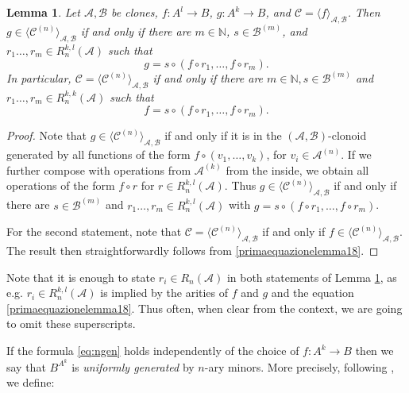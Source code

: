 \documentclass[11pt]{amsart}
\theoremstyle{plain}
\newtheorem{lemma}[thm]{Lemma}
\theoremstyle{definition}
\newcommand{\N}{{\mathbb N}}
\newcommand{\clone}[1]{\mathcal{#1}}
\newcommand{\clonoid}[1]{\mathcal{#1}}
\newcommand{\clodC}{\clonoid{C}}
\newcommand{\cloA}{\clone{A}}
\newcommand{\cloB}{\clone{B}}
\begin{document}
\begin{lemma} \label{lemma:ngen}
Let $\cloA, \cloB$ be clones, $f \colon A^l \to B$, $g \colon A^k \to B$, and $\clodC = \langle f \rangle_{\cloA, \cloB}$. Then $g \in \langle \clodC^{(n)}\rangle_{\cloA, \cloB}$ if and only if there are $m \in \N$, $s \in \cloB^{(m)}$, and $r_1\ldots,r_m \in R_{n}^{k,l}(\cloA)$ such that
\begin{equation}\label{primaequazionelemma18}
    g = s \circ (f \circ r_1, \ldots, f \circ r_m).
\end{equation}
In particular, $\clodC = \langle \clodC^{(n)} \rangle_{\cloA, \cloB}$ if and only if there are $m \in \N, s \in \cloB^{(m)}$ and $r_1\ldots,r_m \in R_{n}^{k,k}(\cloA)$ such that
\begin{equation}f = s \circ (f \circ r_1, \ldots, f \circ r_m). \label{eq:ngen}\end{equation}
\end{lemma}

\begin{proof}
Note that $g \in \langle \clodC^{(n)} \rangle_{\cloA, \cloB}$ if and only if it is in the $(\cloA, \cloB)$-clonoid generated by all functions of the form $f \circ (v_1,\ldots,v_k)$, for $v_i \in \cloA^{(n)}$. If we further compose with operations from $\cloA^{(k)}$ from the inside, we obtain all operations of the form $f \circ r$ for $r\in R_n^{k,l}(\cloA)$. Thus $g \in \langle \clodC^{(n)} \rangle_{\cloA, \cloB}$ if and only if there are 
$s \in \cloB^{(m)}$ and $r_1\ldots,r_m \in R_{n}^{k,l}(\cloA)$ with $g = s \circ (f \circ r_1, \ldots, f \circ r_m)$.

For the second statement, note that $\clodC = \langle \clodC^{(n)} \rangle_{\cloA, \cloB}$ if and only if $f \in \langle \clodC^{(n)} \rangle_{\cloA, \cloB}$. The result then straightforwardly follows from \eqref{primaequazionelemma18}.
\end{proof}

Note that it is enough to state $r_i \in R_n(\cloA)$ in both statements of Lemma \ref{lemma:ngen}, as e.g. $r_i \in R_{n}^{k,l}(\cloA)$ is implied by the arities of $f$ and $g$ and the equation \eqref{primaequazionelemma18}. Thus often, when clear from the context, we are going to omit these superscripts.

If the formula \eqref{eq:ngen} holds independently of the choice of $f\colon A^k \to B$ then we say that $B^{A^k}$ is \emph{uniformly generated} by $n$-ary minors. More precisely, following \cite{MW-clonoidsmodules}, we define:
\end{document}
